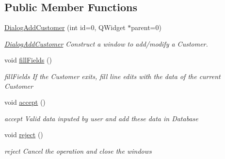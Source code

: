 \subsection*{Public Member Functions}
\begin{DoxyCompactItemize}
\item 
\hyperlink{classGui_1_1Dialogs_1_1DialogAddCustomer_a7ac689e5bcf3c4e28426016b5a2f1478}{Dialog\-Add\-Customer} (int id=0, Q\-Widget $\ast$parent=0)
\begin{DoxyCompactList}\small\item\em \hyperlink{classGui_1_1Dialogs_1_1DialogAddCustomer}{Dialog\-Add\-Customer} Construct a window to add/modify a Customer. \end{DoxyCompactList}\item 
\hypertarget{classGui_1_1Dialogs_1_1DialogAddCustomer_a25d53880ea053c960ee621fec29afb36}{void \hyperlink{classGui_1_1Dialogs_1_1DialogAddCustomer_a25d53880ea053c960ee621fec29afb36}{fill\-Fields} ()}\label{classGui_1_1Dialogs_1_1DialogAddCustomer_a25d53880ea053c960ee621fec29afb36}

\begin{DoxyCompactList}\small\item\em fill\-Fields If the Customer exits, fill line edits with the data of the current Customer \end{DoxyCompactList}\item 
\hypertarget{classGui_1_1Dialogs_1_1DialogAddCustomer_ab9f488af3fdfbf0ca9851cc59946dd5d}{void \hyperlink{classGui_1_1Dialogs_1_1DialogAddCustomer_ab9f488af3fdfbf0ca9851cc59946dd5d}{accept} ()}\label{classGui_1_1Dialogs_1_1DialogAddCustomer_ab9f488af3fdfbf0ca9851cc59946dd5d}

\begin{DoxyCompactList}\small\item\em accept Valid data inputed by user and add these data in Database \end{DoxyCompactList}\item 
\hypertarget{classGui_1_1Dialogs_1_1DialogAddCustomer_a5f3b96e858dedc8a54ff184baafd6e90}{void \hyperlink{classGui_1_1Dialogs_1_1DialogAddCustomer_a5f3b96e858dedc8a54ff184baafd6e90}{reject} ()}\label{classGui_1_1Dialogs_1_1DialogAddCustomer_a5f3b96e858dedc8a54ff184baafd6e90}

\begin{DoxyCompactList}\small\item\em reject Cancel the operation and close the windows \end{DoxyCompactList}\end{DoxyCompactItemize}


